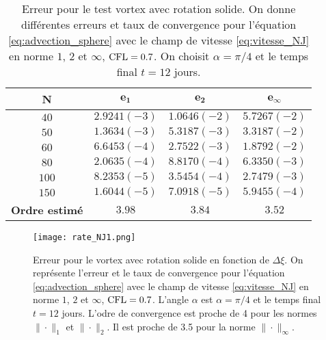 \begin{table}[htbp]
\begin{center}
\begin{tabular}{|c||c|c|c|}
\hline
\textbf{N}  & $\mathbf{e_1}$ & $\mathbf{e_2}$ & $\mathbf{e_{\infty}}$\\
\hline
\hline
$40$  & $2.9241 (-3)$ & $1.0646 (-2)$ & $5.7267 (-2)$ \\
$50$  & $1.3634 (-3)$ & $5.3187 (-3)$ & $3.3187 (-2)$ \\
$60$  & $6.6453 (-4)$ & $2.7522 (-3)$ & $1.8792 (-2)$ \\
$80$  & $2.0635 (-4)$ & $8.8170 (-4)$ & $6.3350 (-3)$ \\
$100$ & $8.2353 (-5)$ & $3.5454 (-4)$ & $2.7479 (-3)$ \\
$150$ & $1.6044 (-5)$ & $7.0918 (-5)$ & $5.9455 (-4)$ \\
\hline 
\hline
\textbf{Ordre estimé}& $3.98$ & $3.84$ & $3.52$\\
\hline
\end{tabular}
\end{center}
\caption{Erreur pour le test vortex avec rotation solide. On donne différentes erreurs et taux de convergence pour l'équation \eqref{eq:advection_sphere} avec le champ de vitesse \eqref{eq:vitesse_NJ} en norme $1$, $2$ et $\infty$, $\text{CFL} = 0.7$. On choisit $\alpha = \pi/4$ et le temps final $t=12$ jours.}
\label{tab:rate1_NJ}
\end{table} 

\begin{figure}[htbp]
\begin{center}
\texttt{[image: rate\_NJ1.png]}
\end{center}
\caption{Erreur pour le vortex avec rotation solide en fonction de $\Delta \xi$. On représente l'erreur et le taux de convergence pour l'équation \eqref{eq:advection_sphere} avec le champ de vitesse \eqref{eq:vitesse_NJ} en norme $1$, $2$ et $\infty$, $\text{CFL} = 0.7$. L'angle $\alpha$ est $\alpha = \pi/4$ et le temps final $t=12$ jours. L'odre de convergence est proche de 4 pour les normes $\| \cdot \|_1$ et $\| \cdot \|_2$. Il est proche de 3.5 pour la norme $\| \cdot \|_{\infty}$.}
\label{fig:rate1_NJ}
\end{figure} 

